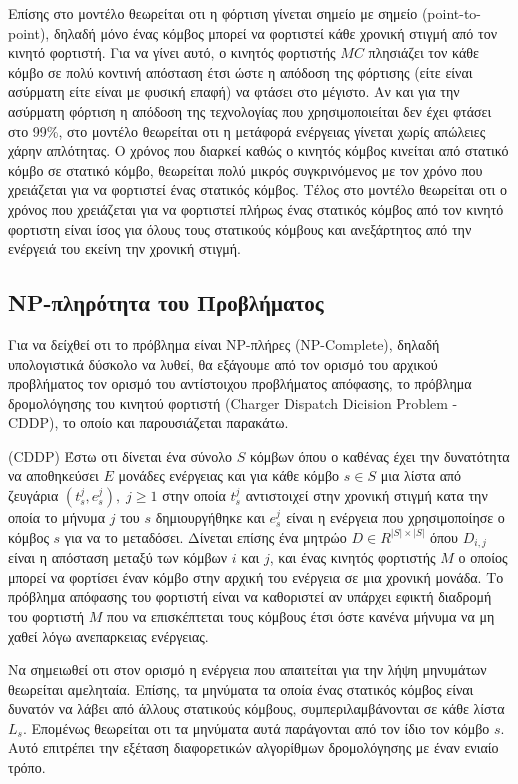 Επίσης στο μοντέλο θεωρείται οτι η φόρτιση γίνεται σημείο με σημείο (point-to-point), δηλαδή μόνο ένας κόμβος μπορεί να φορτιστεί κάθε χρονική στιγμή από τον κινητό
φορτιστή. Για να γίνει αυτό, ο κινητός φορτιστής $MC$ πλησιάζει τον κάθε κόμβο σε πολύ κοντινή απόσταση έτσι ώστε η απόδοση της φόρτισης (είτε είναι ασύρματη είτε
είναι με φυσική επαφή) να φτάσει στο μέγιστο. Αν και για την ασύρματη φόρτιση η απόδοση της τεχνολογίας που χρησιμοποιείται δεν έχει φτάσει στο 99\%, στο μοντέλο
θεωρείται οτι η μετάφορά ενέργειας γίνεται χωρίς απώλειες χάρην απλότητας. Ο χρόνος που διαρκεί καθώς ο κινητός κόμβος κινείται από στατικό κόμβο σε στατικό κόμβο,
θεωρείται πολύ μικρός συγκρινόμενος με τον χρόνο που χρειάζεται για να φορτιστεί ένας στατικός κόμβος. Τέλος στο μοντέλο θεωρείται οτι ο χρόνος που χρειάζεται για να
φορτιστεί πλήρως ένας στατικός κόμβος από τον κινητό φορτιστη είναι ίσος για όλους τους στατικούς κόμβους και ανεξάρτητος από την ενέργειά του εκείνη την χρονική
στιγμή.


\subsection{NP-πληρότητα του Προβλήματος}
Για να δείχθεί οτι το πρόβλημα είναι NP-πλήρες (NP-Complete), δηλαδή υπολογιστικά δύσκολο να λυθεί, θα εξάγουμε από τον ορισμό του αρχικού προβλήματος τον ορισμό του
αντίστοιχου προβλήματος απόφασης, το πρόβλημα δρομολόγησης του κινητού φορτιστή  (Charger Dispatch Dicision Problem - CDDP), το οποίο και παρουσιάζεται παρακάτω.

\begin{definition}
(CDDP) Έστω οτι δίνεται ένα σύνολο $S$ κόμβων όπου ο καθένας έχει την δυνατότητα να αποθηκεύσει $E$ μονάδες ενέργειας και για κάθε κόμβο $s\in S$ μια λίστα από
ζευγάρια $(t_{s}^{j}, e_{s}^{j}),\; j\geq 1$ στην οποία $t_{s}^{j}$ αντιστοιχεί στην χρονική στιγμή κατα την οποία το μήνυμα $j$ του $s$ δημιουργήθηκε και $e^{j}_{s}$
είναι η ενέργεια που χρησιμοποίησε ο κόμβος $s$ για να το μεταδόσει. Δίνεται επίσης ένα μητρώο $D\in R^{|S|\times |S|}$ όπου $D_{i,j}$ είναι η απόσταση μεταξύ των
κόμβων $i$ και $j$, και ένας κινητός φορτιστής $M$ ο οποίος μπορεί να φορτίσει έναν κόμβο στην αρχική του ενέργεια σε μια χρονική μονάδα. Το πρόβλημα απόφασης του
φορτιστή είναι να  καθοριστεί αν υπάρχει εφικτή διαδρομή του φορτιστή $M$ που να επισκέπτεται τους κόμβους έτσι όστε κανένα μήνυμα να μη χαθεί λόγω ανεπαρκειας
ενέργειας.
\end{definition}
Να σημειωθεί οτι στον ορισμό η ενέργεια που απαιτείται για την λήψη μηνυμάτων θεωρείται αμεληταία. Επίσης, τα μηνύματα τα οποία ένας στατικός κόμβος είναι δυνατόν να
λάβει από άλλους στατικούς κόμβους, συμπεριλαμβάνονται σε κάθε λίστα $L_{s}$. Επομένως θεωρείται οτι τα μηνύματα αυτά παράγονται από τον ίδιο τον κόμβο $s$. Αυτό
επιτρέπει την εξέταση διαφορετικών αλγορίθμων δρομολόγησης με έναν ενιαίο τρόπο.


